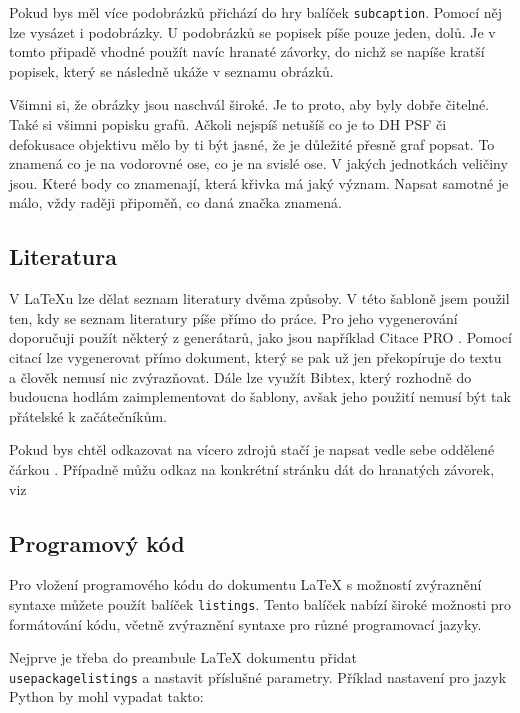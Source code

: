 \documentclass[12pt, a4paper,
oneside,      %
openany
]{report}
\begin{document}
		Pokud bys měl více podobrázků přichází do hry balíček \texttt{subcaption}. Pomocí něj lze vysázet i podobrázky. U podobrázků se popisek píše pouze jeden, dolů. Je v tomto připadě vhodné použít navíc hranaté závorky, do nichž se napíše kratší popisek, který se následně ukáže v seznamu obrázků.
	
	Všimni si, že obrázky jsou naschvál široké. Je to proto, aby byly dobře čitelné. Také si všimni popisku grafů. Ačkoli nejspíš netušíš co je to DH PSF či defokusace objektivu mělo by ti být jasné, že je důležité přesně graf popsat. To znamená co je na vodorovné ose, co je na svislé ose. V jakých jednotkách veličiny jsou. Které body co znamenají, která křivka má jaký význam. Napsat samotné \uv{$\Delta \varphi$} je málo, vždy raději připoměň, co daná značka znamená.
	

	
	\subsection{Literatura}
	
	V \LaTeX{}u lze dělat seznam literatury dvěma způsoby. V této šabloně jsem použil ten, kdy se seznam literatury píše přímo do práce. Pro jeho vygenerování doporučuji použít některý z generátarů, jako jsou například Citace PRO \cite{citacePRO}. Pomocí citací lze vygenerovat přímo dokument, který se pak už jen překopíruje do textu a člověk nemusí nic zvýrazňovat. Dále lze využít Bibtex, který rozhodně do budoucna hodlám zaimplementovat do šablony, avšak jeho použití nemusí být tak přátelské k začátečníkům.
	
	Pokud bys chtěl odkazovat na vícero zdrojů stačí je napsat vedle sebe oddělené čárkou \cite{LaTeXprirucka, citacePRO, Born2019}. Případně můžu odkaz na konkrétní stránku dát do hranatých závorek, viz \cite[str.~1]{Born2019}
	
	\subsection{Programový kód}
	Pro vložení programového kódu do dokumentu LaTeX s možností zvýraznění syntaxe můžete použít balíček \texttt{listings}. Tento balíček nabízí široké možnosti pro formátování kódu, včetně zvýraznění syntaxe pro různé programovací jazyky.
	
	Nejprve je třeba do preambule LaTeX dokumentu přidat \texttt{\\usepackage{listings}} a nastavit příslušné parametry. Příklad nastavení pro jazyk Python by mohl vypadat takto:
	
\end{document}
